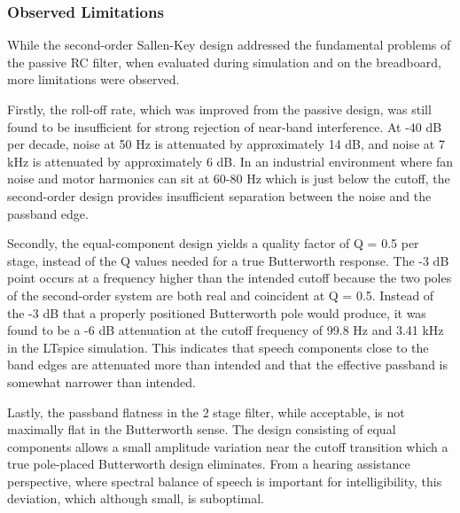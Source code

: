 

\subsubsection{Observed Limitations}

While the second-order Sallen-Key design addressed the fundamental problems of the passive RC filter, when evaluated during simulation and on the breadboard, more limitations were observed.

Firstly, the roll-off rate, which was improved from the passive design, was still found to be insufficient for strong rejection of near-band interference. At -40 dB per decade, noise at 50 Hz is attenuated by approximately 14 dB, and noise at 7 kHz is attenuated by approximately 6 dB. In an industrial environment where fan noise and motor harmonics can sit at 60-80 Hz which is just below the cutoff, the second-order design provides insufficient separation between the noise and the passband edge.

Secondly, the equal-component design yields a quality factor of Q = 0.5 per stage, instead of the Q values needed for a true Butterworth response. The -3 dB point occurs at a frequency higher than the intended cutoff because the two poles of the second-order system are both real and coincident at Q = 0.5. Instead of the -3 dB that a properly positioned Butterworth pole would produce, it was found to be a -6 dB attenuation at the cutoff frequency of 99.8 Hz and 3.41 kHz in the LTspice simulation. This indicates that speech components close to the band edges are attenuated more than intended and that the effective passband is somewhat narrower than intended.

Lastly, the passband flatness in the 2 stage filter, while acceptable, is not maximally flat in the Butterworth sense. The design consisting of equal components allows a small amplitude variation near the cutoff transition which a true pole-placed Butterworth design eliminates. From a hearing assistance perspective, where spectral balance of speech is important for intelligibility, this deviation, which although small, is suboptimal.


